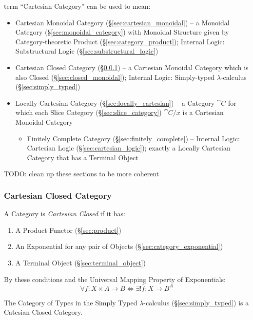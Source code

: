 term ``Cartesian Category'' can be used to mean:
\begin{itemize}
  \item Cartesian Monoidal Category (\S\ref{sec:cartesian_monoidal}) --
    a Monoidal Category (\S\ref{sec:monoidal_category}) with Monoidal Structure
    given by Category-theoretic Product (\S\ref{sec:category_product});
    Internal Logic: Substructural Logic (\S\ref{sec:substructural_logic})
  \item Cartesian Closed Category (\S\ref{sec:cartesian_closed}) -- a Cartesian
    Monoidal Category which is also Closed
    (\S\ref{sec:closed_monoidal});
    Internal Logic: Simply-typed $\lambda$-calculus (\S\ref{sec:simply_typed})
  \item Locally Cartesian Category (\S\ref{sec:locally_cartesian}) -- a
    Category $\cat{C}$ for which each Slice Category
    (\S\ref{sec:slice_category}) $\cat{C} / x$ is a Cartesian Monoidal Category
  \begin{itemize}
    \item Finitely Complete Category (\S\ref{sec:finitely_complete}) --
      Internal Logic: Cartesian Logic (\S\ref{sec:cartesian_logic}); exactly a
      Locally Cartesian Category that has a Terminal Object
  \end{itemize}
\end{itemize}
TODO: clean up these sections to be more coherent



\subsubsection{Cartesian Closed Category}\label{sec:cartesian_closed}

A Category is \emph{Cartesian Closed} if it has:
\begin{enumerate}
  \item A Product Functor (\S\ref{sec:product})
  \item An Exponential for any pair of Objects
    (\S\ref{sec:category_exponential})
  \item A Terminal Object (\S\ref{sec:terminal_object})
\end{enumerate}
By these conditions and the Universal Mapping Property of
Exponentials:
\[
  \forall f : X \times A \rightarrow B \Leftrightarrow
  \exists ! \overline{f} : X \rightarrow B^A
\]

The Category of Types in the Simply Typed $\lambda$-calculus
(\S\ref{sec:simply_typed}) is a Catesian Closed Category.

